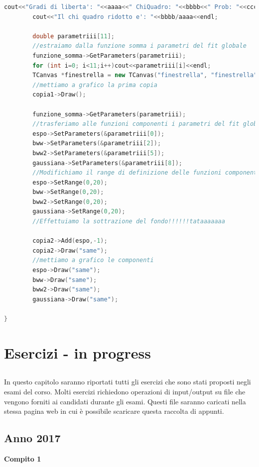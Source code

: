 \documentclass[11pt,fleqn]{book} %
\begin{document}
\begin{lstlisting}[language=c++]
		cout<<"Gradi di liberta': "<<aaaa<<" ChiQuadro: "<<bbbb<<" Prob: "<<cccc<<endl;
		cout<<"Il chi quadro ridotto e': "<<bbbb/aaaa<<endl;

		double parametriii[11];
		//estraiamo dalla funzione somma i parametri del fit globale
		funzione_somma->GetParameters(parametriii);
		for (int i=0; i<11;i++)cout<<parametriii[i]<<endl;
		TCanvas *finestrella = new TCanvas("finestrella", "finestrella",600, 500);
        //mettiamo a grafico la prima copia
		copia1->Draw();

		funzione_somma->GetParameters(parametriii);
        //trasferiamo alle funzioni componenti i parametri del fit globale
		espo->SetParameters(&parametriii[0]);
		bww->SetParameters(&parametriii[2]);
		bww2->SetParameters(&parametriii[5]);
		gaussiana->SetParameters(&parametriii[8]);
		//Modifichiamo il range di definizione delle funzioni componenti
		espo->SetRange(0,20);
		bww->SetRange(0,20);
		bww2->SetRange(0,20);
		gaussiana->SetRange(0,20);
        //Effettuiamo la sottrazione del fondo!!!!!!tataaaaaaa
        
        copia2->Add(espo,-1);
		copia2->Draw("same");
		//mettiamo a grafico le componenti
		espo->Draw("same");
		bww->Draw("same");
		bww2->Draw("same");
		gaussiana->Draw("same");

}
\end{lstlisting}





\chapter{Esercizi - in progress}

\section*{}
In questo capitolo saranno riportati tutti gli esercizi che sono stati proposti negli esami del corso.
Molti esercizi richiedono operazioni di input/output su file che vengono forniti ai candidati durante gli esami. Questi file saranno caricati nella stessa pagina web in cui è possibile scaricare questa raccolta di appunti.



\section{Anno 2017}

\textbf{Compito 1}
\end{document}
